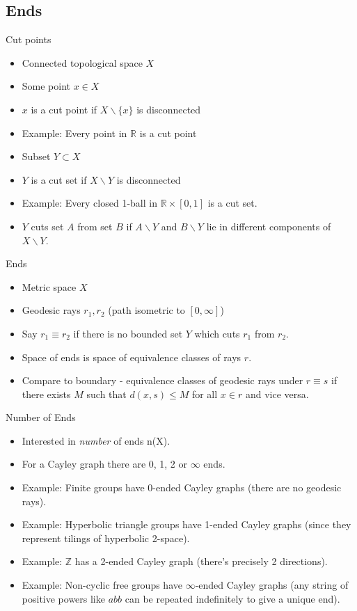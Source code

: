 \documentclass{beamer}
\begin{document}
\subsection{Ends}

\begin{frame}{Cut points}
  \begin{itemize}
    \item Connected topological space $X$
	\item Some point $x \in X$
	\item $x$ is a cut point if $X \backslash \{ x \}$ is disconnected
	\item Example: Every point in $\mathbb{R}$ is a cut point
	\pause
	\item Subset $Y \subset X$
	\item $Y$ is a cut set if $X \backslash Y$ is disconnected
	\item Example: Every closed 1-ball in $\mathbb{R} \times [0,1]$ is a cut set.
	\pause
	\item $Y$ cuts set $A$ from set $B$ if $A \backslash Y$ and $B \backslash Y$ lie in different components of $X \backslash Y$.
  \end{itemize}
\end{frame}

\begin{frame}{Ends}
	\begin{itemize}
		\item Metric space $X$
		\item Geodesic rays $r_1, r_2$ (path isometric to $[0, \infty]$)
		\item Say $r_1 \equiv r_2$ if there is no bounded set $Y$ which cuts $r_1$ from $r_2$.
		\item Space of ends is space of equivalence classes of rays $r$.
		\pause
		\item Compare to boundary - equivalence classes of geodesic rays under $r \equiv s$ if there exists $M$ such that $d(x, s) \le M$ for all $x \in r$ and vice versa.
	\end{itemize}
\end{frame}

\begin{frame}{Number of Ends}
	\begin{itemize}
		\item Interested in \textsl{number} of ends n(X).
		\item For a Cayley graph there are 0, 1, 2 or $\infty$ ends. %
		\pause
		\item Example: Finite groups have 0-ended Cayley graphs (there are no geodesic rays).
		\pause
		\item Example: Hyperbolic triangle groups have 1-ended Cayley graphs (since they represent tilings of hyperbolic 2-space).
		\pause
		\item Example: $\mathbb{Z}$ has a 2-ended Cayley graph (there's precisely 2 directions).
		\pause
		\item Example: Non-cyclic free groups have $\infty$-ended Cayley graphs (any string of positive powers like $abb$ can be repeated indefinitely to give a unique end).
	\end{itemize}
\end{frame}
\end{document}
